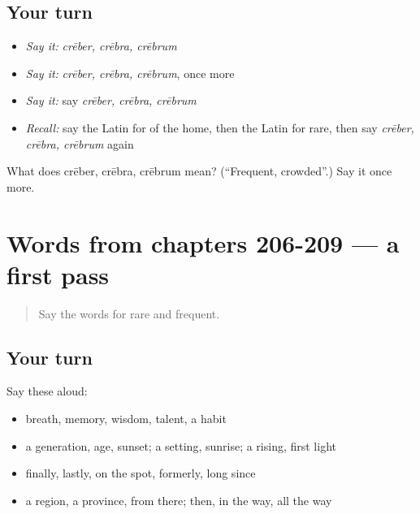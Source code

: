 \subsection*{Your turn}
\begin{itemize}
\raggedright
  \item \emph{Say it:} \emph{crēber, crēbra, crēbrum}
  \item \emph{Say it:} \emph{crēber, crēbra, crēbrum}, once more
  \item \emph{Say it:} say \emph{crēber, crēbra, crēbrum}
  \item \emph{Recall:} say the Latin for of the home, then the Latin for rare, then say \emph{crēber, crēbra, crēbrum} again
\end{itemize}

\begin{tcolorbox}[breakable,colback=teal!4,colframe=teal!35!black,title={Before you move on}]
What does crēber, crēbra, crēbrum mean? (\textquotedblleft{}Frequent, crowded\textquotedblright{}.) Say it once more.
\end{tcolorbox}
\section[(dialogue)]{Words from chapters 206-209 — a first pass}

\label{lesson:LA-R214-first-pass-words-from-chapters-206-209}



\begin{quote}
Say the words for rare and frequent.
\end{quote}

\subsection*{Your turn}
Say these aloud:

\begin{itemize}
\raggedright
  \item breath, memory, wisdom, talent, a habit
  \item a generation, age, sunset; a setting, sunrise; a rising, first light
  \item finally, lastly, on the spot, formerly, long since
  \item a region, a province, from there; then, in the way, all the way
\end{itemize}

